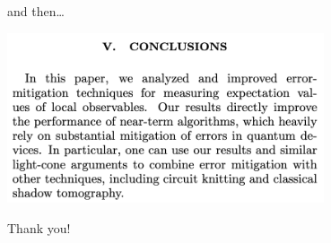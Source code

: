 \documentclass[11pt,aspectratio=1610,xcolor=dvipsnames]{beamer}
\begin{document}
\begin{frame}{and then\dots}
	\begin{center}
		\includegraphics[width=0.7\textwidth]{lookahead}
	\end{center}
\end{frame}

\begin{frame}[standout]
	Thank you!
\end{frame}
\end{document}
